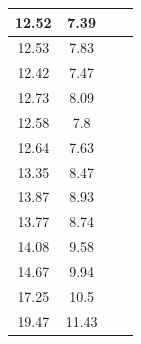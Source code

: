 \documentclass[a4paper, 12pt]{article}%
\begin{document}
\begin{table}[]
\begin{tabular}{|c|c|c|c|}
		12.52                               & 7.39                             &                                    &                                \\ \hline
		12.53                               & 7.83                             &                                    &                                \\ \hline
		12.42                               & 7.47                             &                                    &                                \\ \hline
		12.73                               & 8.09                             &                                    &                                \\ \hline
		12.58                               & 7.8                              &                                    &                                \\ \hline
		12.64                               & 7.63                             &                                    &                                \\ \hline
		13.35                               & 8.47                             &                                    &                                \\ \hline
		13.87                               & 8.93                             &                                    &                                \\ \hline
		13.77                               & 8.74                             &                                    &                                \\ \hline
		14.08                               & 9.58                             &                                    &                                \\ \hline
		14.67                               & 9.94                             &                                    &                                \\ \hline
		17.25                               & 10.5                             &                                    &                                \\ \hline
		19.47                               & 11.43                            &                                    &                                \\ \hline
	\end{tabular}
\end{table}
\end{document}
